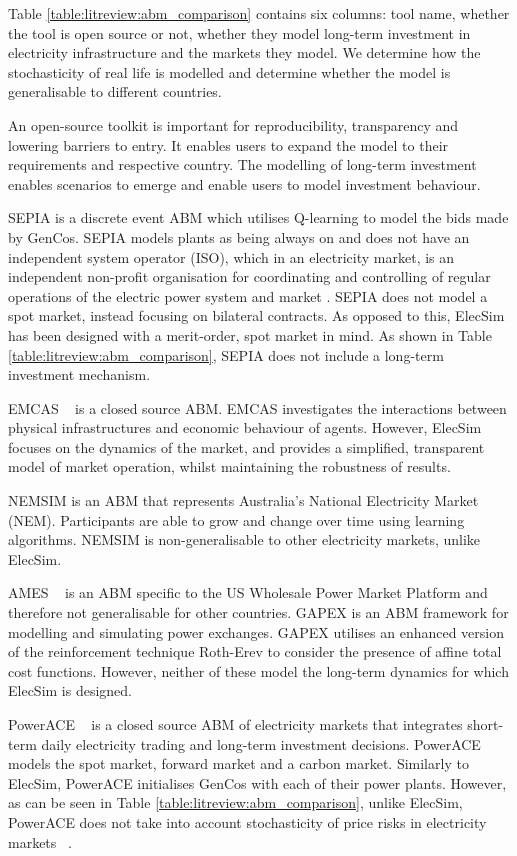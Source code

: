 Table \ref{table:litreview:abm_comparison} contains six columns: tool name, whether the tool is open source or not, whether they model long-term investment in electricity infrastructure and the markets they model. We determine how the stochasticity of real life is modelled and determine whether the model is generalisable to different countries. 


An open-source toolkit is important for reproducibility, transparency and lowering barriers to entry. It enables users to expand the model to their requirements and respective country. The modelling of long-term investment enables scenarios to emerge and enable users to model investment behaviour. 

SEPIA \cite{Harp2000} is a discrete event ABM which utilises Q-learning to model the bids made by GenCos. SEPIA models plants as being always on and does not have an independent system operator (ISO), which in an electricity market, is an independent non-profit organisation for coordinating and controlling of regular operations of the electric power system and market \cite{Zhou2007}. SEPIA does not model a spot market, instead focusing on bilateral contracts. As opposed to this, ElecSim has been designed with a merit-order, spot market in mind. As shown in Table \ref{table:litreview:abm_comparison}, SEPIA does not include a long-term investment mechanism. 

EMCAS ~\cite{Conzelmann} is a closed source ABM. EMCAS investigates the interactions between physical infrastructures and economic behaviour of agents. However, ElecSim focuses on the dynamics of the market, and provides a simplified, transparent model of market operation, whilst maintaining the robustness of results.

NEMSIM \cite{Grozev2005} is an ABM that represents Australia's National Electricity Market (NEM). Participants are able to grow and change over time using learning algorithms. NEMSIM is non-generalisable to other electricity markets, unlike ElecSim.

AMES ~\cite{Sun2007} is an ABM specific to the US Wholesale Power Market Platform and therefore not generalisable for other countries. GAPEX \cite{Cincotti2013} is an ABM framework for modelling and simulating power exchanges. GAPEX utilises an enhanced version of the reinforcement technique Roth-Erev \cite{RothAE1995} to consider the presence of affine total cost functions. However, neither of these model the long-term dynamics for which ElecSim is designed.

PowerACE ~\cite{Rothengatter2007} is a closed source ABM of electricity markets that integrates short-term daily electricity trading and long-term investment decisions. PowerACE models the spot market, forward market and a carbon market. Similarly to ElecSim, PowerACE initialises GenCos with each of their power plants. However, as can be seen in Table \ref{table:litreview:abm_comparison}, unlike ElecSim, PowerACE does not take into account stochasticity of price risks in electricity markets ~\cite{Most2010}.

